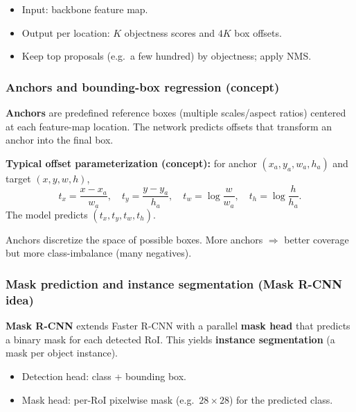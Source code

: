 \documentclass[11pt,a4paper]{article}
\begin{document}
\begin{itemize}
  \item Input: backbone feature map.
  \item Output per location: $K$ objectness scores and $4K$ box offsets.
  \item Keep top proposals (e.g.\ a few hundred) by objectness; apply NMS.
\end{itemize}

\subsubsection{Anchors and bounding-box regression (concept)}

\begin{defbox}
\textbf{Anchors} are predefined reference boxes (multiple scales/aspect ratios) centered at each feature-map location.
The network predicts offsets that transform an anchor into the final box.
\end{defbox}

\begin{mathrule}
\textbf{Typical offset parameterization (concept):}\;
for anchor $(x_a,y_a,w_a,h_a)$ and target $(x,y,w,h)$,
\[
t_x=\frac{x-x_a}{w_a},\quad t_y=\frac{y-y_a}{h_a},\quad
t_w=\log\frac{w}{w_a},\quad t_h=\log\frac{h}{h_a}.
\]
The model predicts $(t_x,t_y,t_w,t_h)$.
\end{mathrule}

\begin{notebox}
Anchors discretize the space of possible boxes. More anchors $\Rightarrow$ better coverage but more class-imbalance (many negatives).
\end{notebox}

\subsubsection{Mask prediction and instance segmentation (Mask R-CNN idea)}

\begin{defbox}
\textbf{Mask R-CNN} extends Faster R-CNN with a parallel \textbf{mask head} that predicts a binary mask for each detected RoI.
This yields \textbf{instance segmentation} (a mask per object instance).
\end{defbox}

\begin{itemize}
  \item Detection head: class + bounding box.
  \item Mask head: per-RoI pixelwise mask (e.g.\ $28\times 28$) for the predicted class.
\end{itemize}
\end{document}
